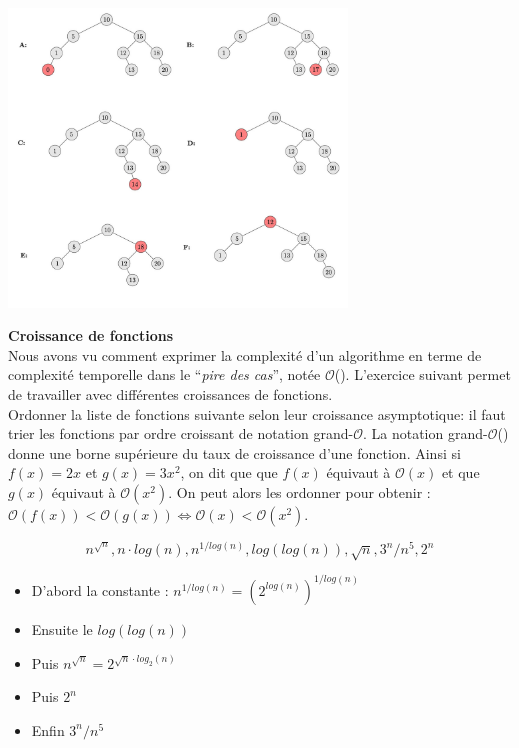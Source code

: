 \begin{Exercice}[20 minutes]
	\begin{solution}
		\centering
		\includegraphics[width=9cm]{solutions/tree_merged.jpg}
	\end{solution}
		
\end{Exercice}

\begin{Exercice}[10 minutes]\textbf{Croissance de fonctions}\\
	Nous avons vu comment exprimer la complexité d'un algorithme en terme de complexité temporelle dans le ``\emph{pire des cas}'', notée $\mathcal{O}$(). L'exercice suivant permet de travailler avec différentes croissances de fonctions.\\ Ordonner la liste de fonctions suivante selon leur croissance asymptotique: il faut trier les fonctions par ordre croissant de notation grand-$\mathcal{O}$. La notation grand-$\mathcal{O}$() donne une borne supérieure du taux de croissance d'une fonction. Ainsi si $f(x) = 2x$ et $g(x) = 3x^2$, on dit que que $f(x)$ équivaut à $\mathcal{O}(x)$ et que $g(x)$ équivaut à $\mathcal{O}(x^2)$. On peut alors les ordonner pour obtenir : $\mathcal{O}(f(x)) < \mathcal{O}(g(x)) \Leftrightarrow \mathcal{O}(x) < \mathcal{O}(x^2)$.
	
		\begin{equation}
			n^{\sqrt{n}}, n\cdot log(n), n^{1/log(n)}, log(log(n)), \sqrt{n}, 3^{n}/{n^5}, 2^n
		\end{equation}
		
		\begin{solution}
			\begin{itemize}
				\item D'abord la constante : $n^{1/log(n)} = (2^{log(n)})^{1/log(n)}$
				\item Ensuite le $log(log(n))$
				\item Puis $n^{\sqrt{n}} = 2^{\sqrt{n}\cdot log_2(n)}$
				\item Puis $2^n$
				\item Enfin  $3^{n}/{n^5}$
			\end{itemize}
		\end{solution}
	\end{Exercice}
	


